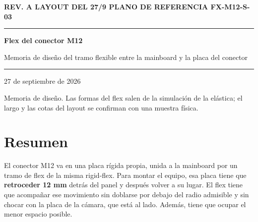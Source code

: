\documentclass[11pt,a4paper]{article}
\begin{document}

\begin{titlepage}
\thispagestyle{empty}
\setlength{\parindent}{0pt}\raggedright
\vspace*{3cm}
{\sffamily\footnotesize\bfseries\color{navy}\MakeUppercase{Rev. A \textperiodcentered{} Layout del 27/9 \textperiodcentered{} Plano de referencia FX-M12-S-03}\par}
\vspace{8pt}
{\color{navy}\rule{\linewidth}{2.5pt}}
\vspace{22pt}

{\sffamily\huge\bfseries Flex del conector M12\par}
\vspace{14pt}
{\sffamily\large\color{gray2} Memoria de diseño del tramo flexible entre la mainboard y la placa del conector\par}
\vspace{30pt}
{\color{rule2}\rule{0.35\linewidth}{0.6pt}\par}
\vspace{12pt}
{\normalsize 27 de septiembre de 2026\par}
\vfill
{\sffamily\footnotesize\color{gray2}Memoria de diseño. Las formas del flex salen de la simulación de la elástica; el largo y las cotas del layout se confirman con una muestra física.\par}
\end{titlepage}
\setcounter{page}{2}

\tableofcontents
\clearpage
{}

\clearpage

\section*{Resumen}

El conector M12 va en una placa rígida propia, unida a la mainboard por un tramo de flex de la misma rigid-flex. Para montar el equipo, esa placa tiene que \textbf{retroceder 12 mm} detrás del panel y después volver a su lugar. El flex tiene que acompañar ese movimiento sin doblarse por debajo del radio admisible y sin chocar con la placa de la cámara, que está al lado. Además, tiene que ocupar el menor espacio posible.
\end{document}
